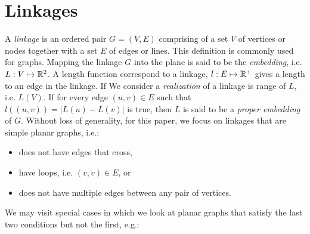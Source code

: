 \section{Linkages}
A \textit{linkage} is an ordered pair $G = (V,E)$ comprising of a set $V$ of vertices or nodes 
together with a set $E$ of edges or lines. This definition is commonly used for graphs.  Mapping 
the linkage $G$ into the plane is said to be the \textit{embedding}, i.e. $L : V \mapsto 
{\mathbb{R}}^{2}$.  A length function correspond to a linkage, $l: E \mapsto {\mathbb{R}}^+$ gives a length to an 
edge in the linkage.  If We consider a \textit{realization} of a linkage is range of $L$, i.e. 
$L(V)$. If for every edge $(u,v) \in E$ such that $l\left( \left(u,v\right) \right) = \left\vert 
L(u) - L(v) \right\vert$ is true, then $L$ is said to be a \textit{proper embedding} of $G$.
Without loss of generality, for this paper, we focus on linkages that are simple planar  graphs, 
i.e.:
\begin{itemize}
\item[\rn{1}] does not have edges that cross,
\item[\rn{2}] have loops, i.e. $(v,v) \in E$, or
\item[\rn{3}] does not have multiple edges between any pair of vertices.
\end{itemize}
We may visit special cases in which we look at planar graphs that satisfy the last two conditions 
but not the first, e.g.:
